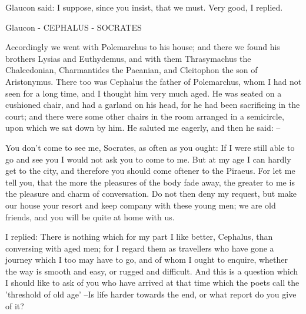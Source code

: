 Glaucon said: I suppose, since you insist, that we must.
Very good, I replied.

Glaucon - CEPHALUS - SOCRATES

Accordingly we went with Polemarchus to his house; and there we found his brothers Lysias and Euthydemus, and with them Thrasymachus the Chalcedonian, Charmantides the Paeanian, and Cleitophon the son of Aristonymus. There too was Cephalus the father of Polemarchus, whom I had not seen for a long time, and I thought him very much aged. He was seated on a cushioned chair, and had a garland on his head, for he had been sacrificing in the court; and there were some other chairs in the room arranged in a semicircle, upon which we sat down by him. He saluted me eagerly, and then he said: --

You don't come to see me, Socrates, as often as you ought: If I were still able to go and see you I would not ask you to come to me. But at my age I can hardly get to the city, and therefore you should come oftener to the Piraeus. For let me tell you, that the more the pleasures of the body fade away, the greater to me is the pleasure and charm of conversation. Do not then deny my request, but make our house your resort and keep company with these young men; we are old friends, and you will be quite at home with us.

I replied: There is nothing which for my part I like better, Cephalus, than conversing with aged men; for I regard them as travellers who have gone a journey which I too may have to go, and of whom I ought to enquire, whether the way is smooth and easy, or rugged and difficult. And this is a question which I should like to ask of you who have arrived at that time which the poets call the 'threshold of old age' --Is life harder towards the end, or what report do you give of it?

